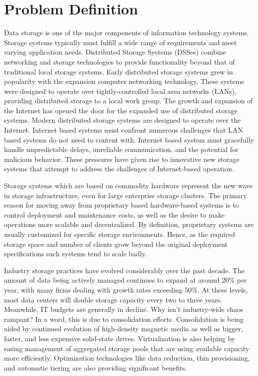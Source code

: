 \documentclass[11pt]{article}
\begin{document}
\section{Problem Definition}
Data storage is one of the major components of information
technology systems. Storage systems typically must fulfill a wide
range of requirements and meet varying application needs.
Distributed Storage Systems (DSSes) combine networking and storage
technologies to provide functionality beyond that of traditional local
storage systems. Early distributed storage systems grew in
popularity with the expansion computer networking technology. These
systems were designed to operate over tightly-controlled local area
networks (LANs), providing distributed storage to a local work group.
The growth and expansion of the Internet has opened the door for
the expanded use of distributed storage systems.
Modern distributed storage systems are designed to operate over the Internet. 
Internet based systems must confront numerous
challenges that LAN based systems do not need to content with.
Internet based system must gracefully handle unpredictable delays,
unreliable communication, and the potential for malicious behavior.
These pressures have given rise to innovative new storage systems that 
attempt to address the challenges of Internet-based operation.

Storage systems which are based on commodity hardware represent the new 
wave in storage infrastructure, even for large enterprise storage clusters. 
The primary reason for moving away from proprietary based hardware-based 
systems is to control deployment and maintenance costs, as well as the 
desire to make operations more scalable and decentralized. By definition, 
proprietary systems are usually customized for specific storage environments. 
Hence, as the required storage space and number of clients grow beyond the 
original deployment specifications such systems tend to scale badly.

Industry storage practices have evolved considerably over the past
decade. The amount of data being actively managed continues to expand
at around 20\% per year, with many firms dealing with growth rates
exceeding 50\%. At these levels, most data centers will double storage
capacity every two to three years. Meanwhile, IT budgets are generally
in decline. Why isn't industry-wide chaos rampant? In a word, this is
due to consolidation efforts. Consolidation is being aided by
continued evolution of high-density magnetic media as well as bigger,
faster, and less expensive solid-state drives. Virtualization is also
helping by easing management of aggregated storage pools that are
using available capacity more efficiently. Optimization technologies
like data reduction, thin provisioning, and automatic tiering are also
providing significant benefits.
\end{document}
